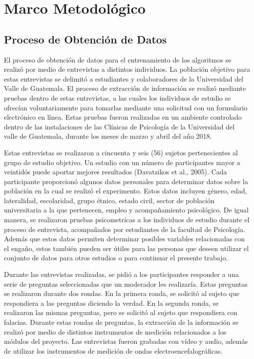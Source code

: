 \chapter{Marco Metodológico}
\section{Proceso de Obtención de Datos}
El proceso de obtención de datos para el entrenamiento de los algoritmos se realizó por medio de entrevistas a distintos individuos. La población objetivo para estas entrevistas se delimitó a estudiantes y colaboradores de la Universidad del Valle de Guatemala. El proceso de extracción de información se realizó mediante pruebas dentro de estas entrevistas, a las cuales los individuos de estudio se ofrecían voluntariamente para tomarlas mediante una solicitud con un formulario electrónico en línea. Estas pruebas fueron realizadas en un ambiente controlado dentro de las instalaciones de las Clínicas de Psicología de la Universidad del valle de Guatemala, durante los meses de marzo y abril del año 2018. 

Estas entrevistas se realizaron a cincuenta y seis (56) sujetos pertenecientes al grupo de estudio objetivo. Un estudio con un número de participantes mayor a veintidós puede aportar mejores resultados (Davatzikos et al., 2005). Cada participante proporcionó algunos datos personales para determinar datos  sobre la población en la cual se realizó el experimento. Estos datos incluyen género, edad, lateralidad, escolaridad, grupo étnico, estado civil, sector de población universitaria a la que pertenecen, empleo y acompañamiento psicológico. De igual manera, se realizaron pruebas psicometrícas a los individuos de estudio durante el proceso de entrevista, acompañados por estudiantes de la facultad de Psicología. Además que estos datos permiten determinar posibles variables relacionadas con el engaño, estos también pueden ser útiles para las personas que deseen utilizar el conjunto de datos para otros estudios o para continuar el presente trabajo.

Durante las entrevistas realizadas, se pidió a los participantes responder a una serie de preguntas seleccionadas que un moderador les realizaría. Estas preguntas se realizaron durante dos rondas. En la primera ronda, se solicitó al sujeto que respondiera a las preguntas diciendo la verdad. En la segunda ronda, se realizaron las mismas preguntas, pero se solicitó al sujeto que respondiera con falacias. Durante estas rondas de preguntas, la extracción de la información se realizó por medio de distintos instrumentos de medición relacionados a los módulos del proyecto. Las entrevistas fueron grabadas con vídeo y audio, además de utilizar los instrumentos de medición de ondas electroencefalográficas.

